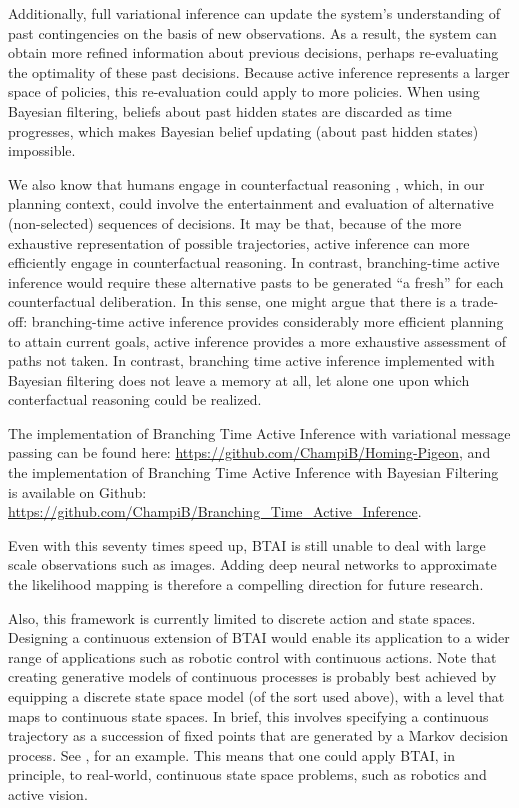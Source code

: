 \documentclass[twoside,11pt]{article}
\begin{document}
Additionally, full variational inference can update the system's understanding of past contingencies on the basis of new observations. As a result, the system can obtain more refined information about previous decisions, perhaps re-evaluating the optimality of these past decisions. Because active inference represents a larger space of policies, this re-evaluation could apply to more policies. When using Bayesian filtering, beliefs about past hidden states are discarded as time progresses, which makes Bayesian belief updating (about past hidden states) impossible.

We also know that humans engage in counterfactual reasoning \citep{rafetseder2013counterfactual}, which, in our planning context, could involve the entertainment and evaluation of alternative (non-selected) sequences of decisions. It may be that, because of the more exhaustive representation of possible trajectories, active inference can more efficiently engage in counterfactual reasoning. In contrast, branching-time active inference would require these alternative pasts to be generated ``a fresh'' for each counterfactual deliberation. In this sense, one might argue that there is a trade-off: branching-time active inference provides considerably more efficient planning to attain current goals, active inference provides a more exhaustive assessment of paths not taken. In contrast, branching time active inference implemented with Bayesian filtering does not leave a memory at all, let alone one upon which conterfactual reasoning could be realized.

The implementation of Branching Time Active Inference with variational message passing can be found here: \url{https://github.com/ChampiB/Homing-Pigeon}, and the implementation of Branching Time Active Inference with Bayesian Filtering is available on Github: \url{https://github.com/ChampiB/Branching\_Time\_Active\_Inference}.

Even with this seventy times speed up, BTAI is still unable to deal with large scale observations such as images. Adding deep neural networks to approximate the likelihood mapping is therefore a compelling direction for future research.

Also, this framework is currently limited to discrete action and state spaces. Designing a continuous extension of BTAI would enable its application to a wider range of applications such as robotic control with continuous actions. Note that creating generative models of continuous processes is probably best achieved by equipping a discrete state space model (of the sort used above), with a level that maps to continuous state spaces. In brief, this involves specifying a continuous trajectory as a succession of fixed points that are generated by a Markov decision process. See \citet{believe}, for an example. This means that one could apply BTAI, in principle, to real-world, continuous state space problems, such as robotics and active vision.
\end{document}
